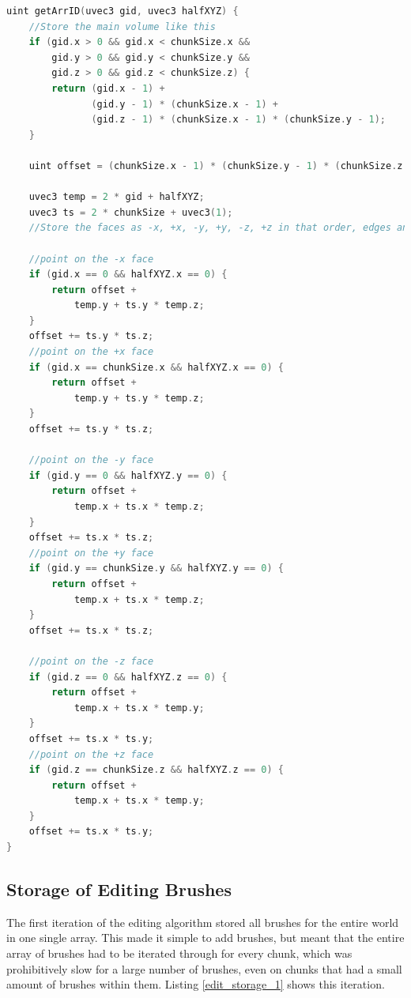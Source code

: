 \documentclass{article}
\begin{document}
\begin{lstlisting}[language=C++,label={tv_arrID_2},caption={A more efficient \texttt{getArrID} function for the Transvoxel algorithm}]
  uint getArrID(uvec3 gid, uvec3 halfXYZ) {
    //Store the main volume like this
    if (gid.x > 0 && gid.x < chunkSize.x &&
        gid.y > 0 && gid.y < chunkSize.y &&
        gid.z > 0 && gid.z < chunkSize.z) {
        return (gid.x - 1) +
               (gid.y - 1) * (chunkSize.x - 1) +
               (gid.z - 1) * (chunkSize.x - 1) * (chunkSize.y - 1); 
    }

    uint offset = (chunkSize.x - 1) * (chunkSize.y - 1) * (chunkSize.z - 1);

    uvec3 temp = 2 * gid + halfXYZ;
    uvec3 ts = 2 * chunkSize + uvec3(1);
    //Store the faces as -x, +x, -y, +y, -z, +z in that order, edges and corners are stored in the first place in this ordering (some unpopulated values)

    //point on the -x face
    if (gid.x == 0 && halfXYZ.x == 0) {
        return offset +
            temp.y + ts.y * temp.z;
    }
    offset += ts.y * ts.z;
    //point on the +x face
    if (gid.x == chunkSize.x && halfXYZ.x == 0) {
        return offset +
            temp.y + ts.y * temp.z;
    }
    offset += ts.y * ts.z;

    //point on the -y face
    if (gid.y == 0 && halfXYZ.y == 0) {
        return offset +
            temp.x + ts.x * temp.z;
    }
    offset += ts.x * ts.z;
    //point on the +y face
    if (gid.y == chunkSize.y && halfXYZ.y == 0) {
        return offset +
            temp.x + ts.x * temp.z;
    }
    offset += ts.x * ts.z;

    //point on the -z face
    if (gid.z == 0 && halfXYZ.z == 0) {
        return offset +
            temp.x + ts.x * temp.y;
    }
    offset += ts.x * ts.y;
    //point on the +z face
    if (gid.z == chunkSize.z && halfXYZ.z == 0) {
        return offset +
            temp.x + ts.x * temp.y;
    }
    offset += ts.x * ts.y;
}
\end{lstlisting}

\subsection{Storage of Editing Brushes}
The first iteration of the editing algorithm stored all brushes for the entire world in one single array. This made it simple to add brushes, but meant that the entire array of brushes had to be iterated through for every chunk, which was prohibitively slow for a large number of brushes, even on chunks that had a small amount of brushes within them. Listing \ref{edit_storage_1} shows this iteration.
\end{document}
